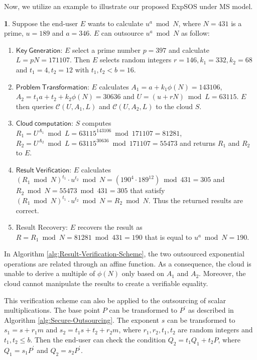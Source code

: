 \documentclass[english,draftcls,onecolumn,11pt]{IEEEtran}
\theoremstyle{definition}
\theoremstyle{plain}
\theoremstyle{plain}
\theoremstyle{definition}
\newtheorem{example}{\protect\examplename}
\providecommand{\examplename}{Example}
\begin{document}
Now, we utilize an example to illustrate our proposed ExpSOS under
MS model.
\begin{example}
Suppose the end-user $E$ wants to calculate $u^{a}\bmod N$, where
$N=431$ is a prime, $u=189$ and $a=346$. $E$ can outsource $u^{a}\bmod N$
as follow:\end{example}
\begin{enumerate}
\item $\mathsf{Key\ Generation}$: $E$ select a prime number $p=397$ and
calculate $L=pN=171107$. Then $E$ selects random integers $r=146,k_{1}=332,k_{2}=68$
and $t_{1}=4,t_{2}=12$ with $t_{1},t_{2}<b=16$.
\item $\mathsf{Problem\ Transformation}$: $E$ calculates $A_{1}=a+k_{1}\phi(N)=143106$,
$A_{2}=t_{1}a+t_{2}+k_{2}\phi(N)=30636$ and $U=(u+rN)\bmod L=63115$.
$E$ then queries $\mathcal{C}(U,A_{1},L)$ and $\mathcal{C}(U,A_{2},L)$
to the cloud $S$.
\item $\mathsf{Cloud\ computation}$: $S$ computes $R_{1}=U^{A_{1}}\bmod L=63115^{143106}\bmod171107=81281$,
$R_{2}=U^{A_{2}}\bmod L=63115^{30636}\bmod171107=55473$ and returns
$R_{1}$ and $R_{2}$ to $E$.
\item $\mathsf{Result\ Verification}$: $E$ calculates $(R_{1}\bmod N)^{t_{1}}\cdot u^{t_{2}}\bmod N=(190^{4}\cdot189^{12})\bmod431=305$
and $R_{2}\bmod N=55473\bmod431=305$ that satisfy $(R_{1}\bmod N)^{t_{1}}\cdot u^{t_{2}}\bmod N=R_{2}\bmod N$.
Thus the returned results are correct.
\item Result Recovery: $E$ recovers the result as $R=R_{1}\bmod N=81281\bmod431=190$
that is equal to $u^{a}\bmod N=190$.
\end{enumerate}
In Algorithm \ref{alg:Result-Verification-Scheme}, the two outsourced
exponential operations are related through an affine function. As
a consequence, the cloud is unable to derive a multiple of $\phi(N)$
only based on $A_{1}$ and $A_{2}$. Moreover, the cloud cannot manipulate
the results to create a verifiable equality. 

This verification scheme can also be applied to the outsourcing of
scalar multiplications. The base point $P$ can be transformed to
$P^{\prime}$ as described in Algorithm \ref{alg:Secure-Outsourcing}.
The exponent $s$ can be transformed to $s_{1}=s+r_{1}m$ and $s_{2}=t_{1}s+t_{2}+r_{2}m$,
where $r_{1},r_{2},t_{1},t_{2}$ are random integers and $t_{1},t_{2}\leq b$.
Then the end-user can check the condition $Q_{2}=t_{1}Q_{1}+t_{2}P$,
where $Q_{1}=s_{1}P^{\prime}$ and $Q_{2}=s_{2}P^{\prime}$. 
\end{document}
